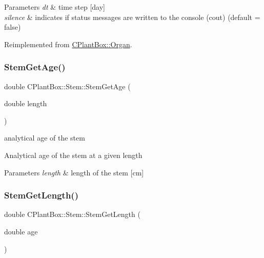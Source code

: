\begin{DoxyParams}{Parameters}
{\em dt} & time step \mbox{[}day\mbox{]} \\
\hline
{\em silence} & indicates if status messages are written to the console (cout) (default = false) \\
\hline
\end{DoxyParams}


Reimplemented from \hyperlink{classCPlantBox_1_1Organ_acf519fc6730c0adbb2a82b7702ff7a28}{C\+Plant\+Box\+::\+Organ}.

\mbox{\label{classCPlantBox_1_1Stem_a01e6785e387a9f3ed1e60a473fc051ce}} 
\subsubsection{\texorpdfstring{Stem\+Get\+Age()}{StemGetAge()}}
{\footnotesize\ttfamily double C\+Plant\+Box\+::\+Stem\+::\+Stem\+Get\+Age (\begin{DoxyParamCaption}\item[{double}]{length }\end{DoxyParamCaption})}



analytical age of the stem 

Analytical age of the stem at a given length


\begin{DoxyParams}{Parameters}
{\em length} & length of the stem \mbox{[}cm\mbox{]} \\
\hline
\end{DoxyParams}
\mbox{\label{classCPlantBox_1_1Stem_a0c3ddde7bf9fb0441c7b95ad05347685}} 
\subsubsection{\texorpdfstring{Stem\+Get\+Length()}{StemGetLength()}}
{\footnotesize\ttfamily double C\+Plant\+Box\+::\+Stem\+::\+Stem\+Get\+Length (\begin{DoxyParamCaption}\item[{double}]{age }\end{DoxyParamCaption})}



